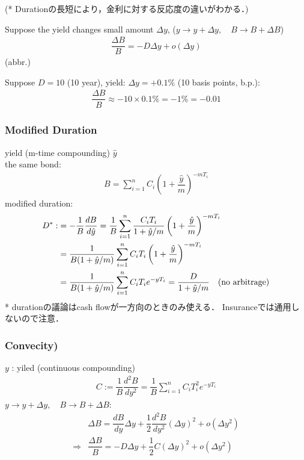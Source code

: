\documentclass[a4paper,11pt]{jsarticle}
\theoremstyle{definition}
\newcommand{\df}[2]{\dfrac{#1}{#2}}
\begin{document}
(* Durationの長短により，金利に対する反応度の違いがわかる．)

Suppose the yield changes small amount $\Delta y$, 
($y\to y+\Delta y, \quad B\to B+\Delta B$) \\
\begin{align}
  \df{\Delta B}{B}=-D\Delta y + o(\Delta y)
\end{align}
(abbr.)

Suppose $D=10$ (10 year),
yield: $\Delta y=+0.1\%$ (10 basis points, b.p.):
\begin{align}
  \df{\Delta B}{B} \approx -10 \times 0.1\% =-1\%=-0.01
\end{align}


\subsubsection{Modified Duration}
yield (m-time compounding) $\hat{y}$ \\
the same bond: 
\begin{align}
  B=\sum_{i=1}^{n}C_i \left(1+\df{\hat{y}}{m}\right)^{-mT_i}  
\end{align}
modified duration:
\begin{align}
  D^{*}:&=-\df{1}{B} \df{dB}{d\hat{y}}
  =\df{1}{B}\sum_{i=1}^{n}\df{C_i T_i}{1+\hat{y}/m}
  \left(1+\df{\hat{y}}{m}\right)^{-mT_i} \notag\\
  &=\df{1}{B(1+\hat{y}/m)}\sum_{i=1}^{n}C_i T_i
  \left(1+\df{\hat{y}}{m}\right)^{-mT_i} \notag\\
  &=\df{1}{B(1+\hat{y}/m)}\sum_{i=1}^{n}C_i T_i e^{-yT_i}
  =\df{D}{1+\hat{y}/m} \quad (\mbox{no arbitrage})
\end{align}
* durationの議論はcash flowが一方向のときのみ使える．
Insuranceでは通用しないので注意．


\subsubsection{Convecity)}
$y$ : yiled (continuous compounding)
\begin{align}
  C:=\df{1}{B}\df{d^2B}{dy^2}
  =\df{1}{B}\sum_{i=1}^{n}C_i T_i^2 e^{-yT_i}
\end{align}
$y\to y+\Delta y, \quad B\to B+\Delta B$:
\begin{align}
  &\Delta B=\df{dB}{dy}\Delta y
  +\df{1}{2}\df{d^2B}{dy^2}(\Delta y)^2+o(\Delta y^2) \\
  \Rightarrow&\df{\Delta B}{B}=-D\Delta y
  +\df{1}{2}C(\Delta y)^2+o(\Delta y^2) 
\end{align}
\end{document}
